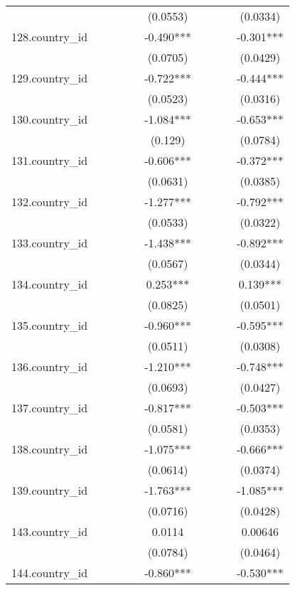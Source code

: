 \documentclass[]{article}
\begin{document}
\begin{tabular}{lccccccccc}
 &  &  &  &  & (0.0553) &  &  &  & (0.0334) \\
128.country\_id &  &  &  &  & -0.490*** &  &  &  & -0.301*** \\
 &  &  &  &  & (0.0705) &  &  &  & (0.0429) \\
129.country\_id &  &  &  &  & -0.722*** &  &  &  & -0.444*** \\
 &  &  &  &  & (0.0523) &  &  &  & (0.0316) \\
130.country\_id &  &  &  &  & -1.084*** &  &  &  & -0.653*** \\
 &  &  &  &  & (0.129) &  &  &  & (0.0784) \\
131.country\_id &  &  &  &  & -0.606*** &  &  &  & -0.372*** \\
 &  &  &  &  & (0.0631) &  &  &  & (0.0385) \\
132.country\_id &  &  &  &  & -1.277*** &  &  &  & -0.792*** \\
 &  &  &  &  & (0.0533) &  &  &  & (0.0322) \\
133.country\_id &  &  &  &  & -1.438*** &  &  &  & -0.892*** \\
 &  &  &  &  & (0.0567) &  &  &  & (0.0344) \\
134.country\_id &  &  &  &  & 0.253*** &  &  &  & 0.139*** \\
 &  &  &  &  & (0.0825) &  &  &  & (0.0501) \\
135.country\_id &  &  &  &  & -0.960*** &  &  &  & -0.595*** \\
 &  &  &  &  & (0.0511) &  &  &  & (0.0308) \\
136.country\_id &  &  &  &  & -1.210*** &  &  &  & -0.748*** \\
 &  &  &  &  & (0.0693) &  &  &  & (0.0427) \\
137.country\_id &  &  &  &  & -0.817*** &  &  &  & -0.503*** \\
 &  &  &  &  & (0.0581) &  &  &  & (0.0353) \\
138.country\_id &  &  &  &  & -1.075*** &  &  &  & -0.666*** \\
 &  &  &  &  & (0.0614) &  &  &  & (0.0374) \\
139.country\_id &  &  &  &  & -1.763*** &  &  &  & -1.085*** \\
 &  &  &  &  & (0.0716) &  &  &  & (0.0428) \\
143.country\_id &  &  &  &  & 0.0114 &  &  &  & 0.00646 \\
 &  &  &  &  & (0.0784) &  &  &  & (0.0464) \\
144.country\_id &  &  &  &  & -0.860*** &  &  &  & -0.530*** \\

\end{tabular}
\end{document}
